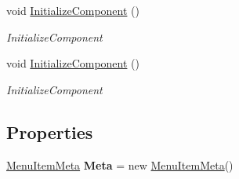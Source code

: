 \begin{DoxyCompactItemize}
void \mbox{\hyperlink{class_teacher_handbook_1_1_plugins_1_1_feed_1_1_feed_af30cfc1a3c7dc2b1874970fbc721113d}{Initialize\+Component}} ()
\begin{DoxyCompactList}\small\item\em Initialize\+Component \end{DoxyCompactList}\item 
void \mbox{\hyperlink{class_teacher_handbook_1_1_plugins_1_1_feed_1_1_feed_af30cfc1a3c7dc2b1874970fbc721113d}{Initialize\+Component}} ()
\begin{DoxyCompactList}\small\item\em Initialize\+Component \end{DoxyCompactList}\end{DoxyCompactItemize}
\subsection*{Properties}
\begin{DoxyCompactItemize}
\item 
\mbox{\label{class_teacher_handbook_1_1_plugins_1_1_feed_1_1_feed_ad6b1451650ec2439f1aee0707514ef63}} 
\mbox{\hyperlink{class_uniform_client_1_1_plugins_1_1_menu_item_meta}{Menu\+Item\+Meta}} {\bfseries Meta} = new \mbox{\hyperlink{class_uniform_client_1_1_plugins_1_1_menu_item_meta}{Menu\+Item\+Meta}}()
\end{DoxyCompactItemize}

